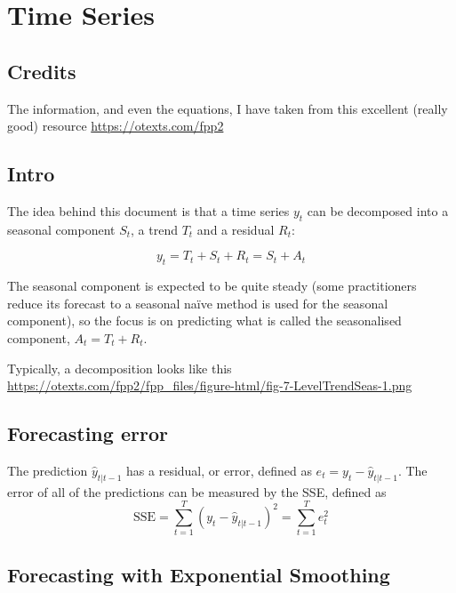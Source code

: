 \documentclass{article}
\begin{document}
\pagestyle{empty}

\section{Time Series}

\subsection{Credits}

The information, and even the equations, I have taken from this excellent (really good) resource \url{https://otexts.com/fpp2}

\subsection{Intro}

The idea behind this document is that a time series $y_t$ can be decomposed into a seasonal component $S_t$, a trend $T_t$ and a residual $R_t$:

\begin{equation}
  y_t = T_t + S_{t} + R_t = S_t + A_t
\label{eqn:basic_decomposition}
\end{equation}

The seasonal component is expected to be quite steady (some practitioners reduce its forecast to a seasonal na\"ive method is used for the seasonal component), so the focus is on predicting what is called the seasonalised component, $A_t = T_t  + R_t$.

Typically, a decomposition looks like this \url{https://otexts.com/fpp2/fpp_files/figure-html/fig-7-LevelTrendSeas-1.png}



\subsection{Forecasting error}

The prediction $\hat{y}_{t|t-1}$ has a residual, or error, defined as $e_t=y_t - \hat{y}_{t|t-1}$. The error of all of the predictions can be measured by the SSE, defined as 
\begin{equation}
 \text{SSE}=\sum_{t=1}^T(y_t - \hat{y}_{t|t-1})^2=\sum_{t=1}^Te_t^2
 \label{eqn:error_sse}
\end{equation}

\subsection{Forecasting with Exponential Smoothing}
\end{document}
